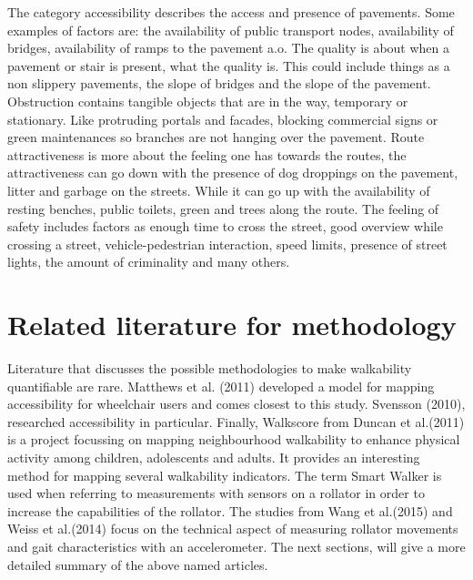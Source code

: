The category accessibility describes the access and presence of pavements. Some examples of factors are: the availability of public transport nodes, availability of bridges, availability of ramps to the pavement a.o. 
The quality is about when a pavement or stair is present, what the quality is. This could include things as a non slippery pavements, the slope of bridges and the slope of the pavement. 
Obstruction contains tangible objects that are in the way, temporary or stationary. Like protruding portals and facades, blocking commercial signs or green maintenances so branches are not hanging over the pavement.
Route attractiveness is more about the feeling one has towards the routes, the attractiveness can go down with the presence of dog droppings on the pavement, litter and garbage on the streets. While it can go up with the availability of resting benches, public toilets, green and trees along the route. 
The feeling of safety includes factors as enough time to cross the street, good overview while crossing a street, vehicle-pedestrian interaction, speed limits, presence of street lights, the amount of criminality and many others. 

\section{Related literature for methodology}\label{literature}
Literature that discusses the possible methodologies to make walkability quantifiable are rare. Matthews et al. (2011) developed a model for mapping accessibility for wheelchair users and comes closest to this study. Svensson (2010), researched accessibility in particular. Finally, Walkscore from Duncan et al.(2011) is a project focussing on mapping neighbourhood walkability to enhance physical activity among children, adolescents and adults. It provides an interesting method for mapping several walkability indicators. 
The term Smart Walker is used when referring to measurements with sensors on a rollator in order to increase the capabilities of the rollator. The studies from Wang et al.(2015) and Weiss et al.(2014) focus on the technical aspect of measuring rollator movements and gait characteristics with an accelerometer. The next sections, will give a more detailed summary of the above named articles. 

